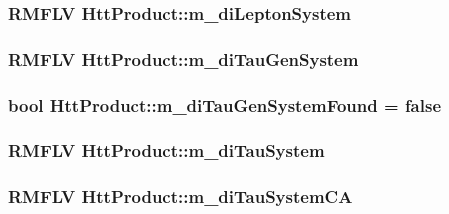 \label{classHttProduct_aae54f2c0092ba8aea1b631f5ba8ca813}
\hypertarget{classHttProduct_a507d922119a2091de4885740846c3b6b}{
\subsubsection[{m\_\-diLeptonSystem}]{\setlength{\rightskip}{0pt plus 5cm}RMFLV {\bf HttProduct::m\_\-diLeptonSystem}}}
\label{classHttProduct_a507d922119a2091de4885740846c3b6b}
\hypertarget{classHttProduct_aeff39416edd99d269ce0ca52f551f252}{
\subsubsection[{m\_\-diTauGenSystem}]{\setlength{\rightskip}{0pt plus 5cm}RMFLV {\bf HttProduct::m\_\-diTauGenSystem}}}
\label{classHttProduct_aeff39416edd99d269ce0ca52f551f252}
\hypertarget{classHttProduct_a6cccf4c815d41dfa8fd2956960d3794b}{
\subsubsection[{m\_\-diTauGenSystemFound}]{\setlength{\rightskip}{0pt plus 5cm}bool {\bf HttProduct::m\_\-diTauGenSystemFound} = false}}
\label{classHttProduct_a6cccf4c815d41dfa8fd2956960d3794b}
\hypertarget{classHttProduct_aeda613181415aa218fe0cacc9bb3e7a5}{
\subsubsection[{m\_\-diTauSystem}]{\setlength{\rightskip}{0pt plus 5cm}RMFLV {\bf HttProduct::m\_\-diTauSystem}}}
\label{classHttProduct_aeda613181415aa218fe0cacc9bb3e7a5}
\hypertarget{classHttProduct_a1a670963cdd4350b7abc851b0b69366e}{
\subsubsection[{m\_\-diTauSystemCA}]{\setlength{\rightskip}{0pt plus 5cm}RMFLV {\bf HttProduct::m\_\-diTauSystemCA}}}
